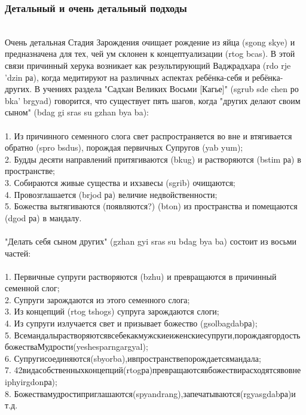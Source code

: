 \newpage
\subsubsection{Детальный и очень детальный подходы}
\\
Очень детальная Стадия Зарождения очищает рождение из яйца (sgong skye) и
предназначена для тех, чей ум склонен к концептуализации (rtog bcas). В этой связи
причинный херука возникает как результирующий Ваджрадхара (rdo rje 'dzin ра), когда
медитируют на различных аспектах ребёнка-себя и ребёнка-других. В учениях раздела
"Садхан Великих Восьми [Кагье]" (sgrub sde chen ро bka' brgyad) говорится, что существует
пять шагов, когда "других делают своим сыном" (bdag gi sras su gzhan bya ba):\\
\\
1. Из причинного семенного слога свет распространяется во вне и втягивается обратно
(spro bsdus), порождая первичных Супругов (yab yum);\\
2. Будды десяти направлений притягиваются (bkug) и растворяются (bstim ра) в пространстве;\\
3. Собираются живые существа и ихзавесы (sgrib) очищаются;\\
4. Провозглашается (brjod ра) величие недвойственности;\\
5. Божества вытягиваются (появляются?) (bton) из пространства и помещаются (dgod ра) в мандалу.\\
\\
"Делать себя сыном других" (gzhan gyi sras su bdag bya ba) состоит из восьми частей:\\
\\
1. Первичные супруги растворяются (bzhu) и превращаются в причинный семенной слог;\\
2. Супруги зарождаются из этого семенного слога;\\
3. Из концепций (rtog tshogs) супруга зарождаются слоги;\\
4. Из супруги излучается свет и призывает божество (gsolbagdabра);\\
5.  Всемандалырастворяютсявсебекакмужскиеиженскиесупруги,порождаягордость
божестваМудрости(yeshesparngargyal);\\
6.  Супругисоединяются(sbyorba),ивпространствепорождаетсямандала;\\
7.  42видасобственныхконцепций(rtogра)превращаютсявбожествирасходятсявовне
iphyirgdonра);\\
8.  Божествамудростиприглашаются(spyandrang),запечатываются(rgyasgdabра)и
т.д.\\


